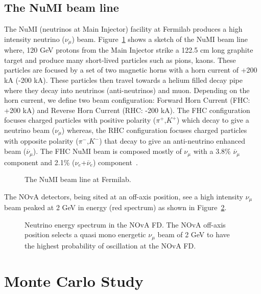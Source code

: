 \documentclass[12pt]{article}
\begin{document}
\subsection{The NuMI beam line}
The NuMI (neutrinos at Main Injector) facility at Fermilab produces a high intensity neutrino ($\nu_{\mu}$) beam. Figure~\ref{fig:numibeamline} shows a sketch of the NuMI beam line  where, 120 GeV protons from the Main Injector strike a 122.5 cm long graphite target and produce many short-lived particles such as pions, kaons. These particles are focused by a set of two magnetic horns with a horn current of +200 kA (-200 kA).  These particles then travel towards a helium filled decay pipe where they decay into neutrinos (anti-neutrinos) and muon. Depending on the horn current, we define two beam configuration: Forward Horn Current (FHC: +200 kA) and Reverse Horn Current (RHC: -200 kA). The FHC configuration focuses charged particles with positive polarity ($\pi^{+}$,$K^{+}$) which decay to give a neutrino beam ($\nu_{\mu}$) whereas, the RHC configuration focuses charged particles with opposite polarity ($\pi^{-}$,$K^{-}$) that decay to give an anti-neutrino enhanced beam ($\overbar{\nu}_{\mu}$). The FHC NuMI beam is composed mostly of $\nu_{\mu}$ with a 3.8\% $\overbar{\nu}_{\mu}$ component and 2.1\% ($\nu_{e}$+$\overbar{\nu}_{e}$) component~\cite{Adamson}.

\begin{figure}[htb]
\begin{center}
\caption{The NuMI beam line at Fermilab.}
\label{fig:numibeamline}
\end{center}
\end{figure}

The NOvA detectors, being sited at an off-axis position, see a high intensity $\nu_{\mu}$ beam peaked at 2 GeV in energy (red spectrum) as shown in Figure~\ref{fig:fdSpectrum}. 

\begin{figure}[htb]
\begin{center}
\caption{Neutrino energy spectrum in the NOvA FD. The NOvA off-axis position selects a quasi mono energetic  $\nu_{\mu}$ beam of 2 GeV to have the highest probability of oscillation at the NOvA FD.}
\label{fig:fdSpectrum}
\end{center}
\end{figure}


\section{Monte Carlo Study}
\end{document}
